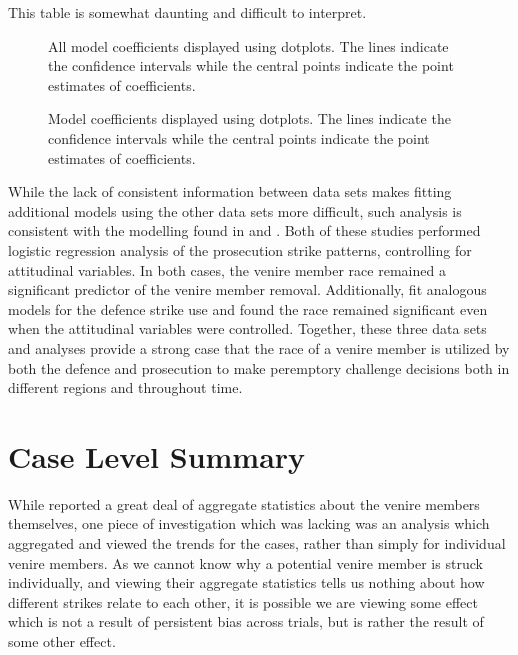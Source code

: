 This table is somewhat daunting and difficult to interpret.

\begin{figure}[h!]
  \centering
  \caption[All Model Coefficients]{All model coefficients displayed using dotplots. The lines indicate the confidence intervals
    while the central points indicate the point estimates of coefficients.}
  \label{fig:modallcoef}
\end{figure}

\begin{figure}[h!]
  \centering
  \caption[Select Model Coefficients]{Model coefficients displayed using dotplots. The lines indicate the confidence intervals
    while the central points indicate the point estimates of coefficients.}
  \label{fig:modselcoef}
\end{figure}

While the lack of consistent information between data sets makes fitting additional models using the other data sets more
difficult, such analysis is consistent with the modelling found in \cite{StubbornLegacy} and \cite{PerempChalMurder}. Both of
these studies performed logistic regression analysis of the prosecution strike patterns, controlling for attitudinal variables. In
both cases, the venire member race remained a significant predictor of the venire member removal. Additionally,
\citeauthor{PerempChalMurder} fit analogous models for the defence strike use and found the race remained significant even when
the attitudinal variables were controlled. Together, these three data sets and analyses provide a strong case that the race of a
venire member is utilized by both the defence and prosecution to make peremptory challenge decisions both in different regions and
throughout time.
                
\section{Case Level Summary} \label{sec:casesum}

While \cite{JurySunshineProj} reported a great deal of aggregate statistics about the venire members themselves, one piece of
investigation which was lacking was an analysis which aggregated and viewed the trends for the cases, rather than simply for
individual venire members. As we cannot know why a potential venire member is struck individually, and viewing their aggregate
statistics tells us nothing about how different strikes relate to each other, it is possible we are viewing some effect which is
not a result of persistent bias across trials, but is rather the result of some other effect.

